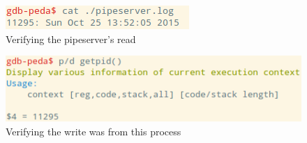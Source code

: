 \documentclass[letter,12pt,sffamily]{article}
\begin{document}
\begin{figure}[H]
	\centering
	\includegraphics[width=.5\linewidth]{./images/20}
	\caption[verifying_pipeserver_read]{Verifying the pipeserver's read}
	\label{fig:21}
\end{figure}
\begin{figure}[H]
	\centering
	\includegraphics[width=.7\linewidth]{./images/21}
	\caption[verifying_write_from_current_pid]{Verifying the write was from this process}
	\label{fig:22}
\end{figure}
\end{document}
